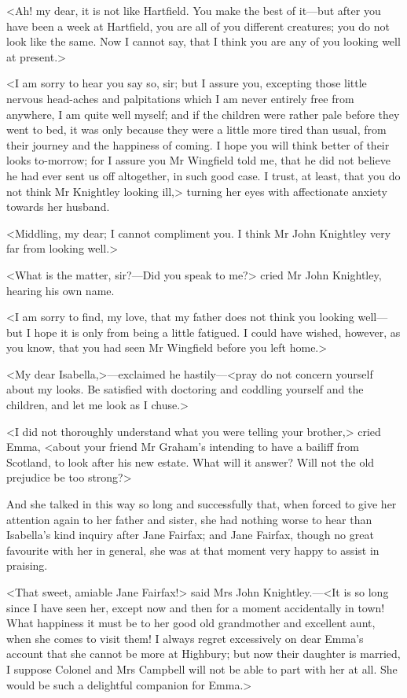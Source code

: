 <Ah! my dear, it is not like Hartfield. You make the best of it—but after you have been a week at Hartfield, you are all of you different creatures; you do not look like the same. Now I cannot say, that I think you are any of you looking well at present.>

<I am sorry to hear you say so, sir; but I assure you, excepting those little nervous head-aches and palpitations which I am never entirely free from anywhere, I am quite well myself; and if the children were rather pale before they went to bed, it was only because they were a little more tired than usual, from their journey and the happiness of coming. I hope you will think better of their looks to-morrow; for I assure you Mr Wingfield told me, that he did not believe he had ever sent us off altogether, in such good case. I trust, at least, that you do not think Mr Knightley looking ill,> turning her eyes with affectionate anxiety towards her husband.

<Middling, my dear; I cannot compliment you. I think Mr John Knightley very far from looking well.>

<What is the matter, sir?—Did you speak to me?> cried Mr John Knightley, hearing his own name.

<I am sorry to find, my love, that my father does not think you looking well—but I hope it is only from being a little fatigued. I could have wished, however, as you know, that you had seen Mr Wingfield before you left home.>

<My dear Isabella,>—exclaimed he hastily—<pray do not concern yourself about my looks. Be satisfied with doctoring and coddling yourself and the children, and let me look as I chuse.>

<I did not thoroughly understand what you were telling your brother,> cried Emma, <about your friend Mr Graham's intending to have a bailiff from Scotland, to look after his new estate. What will it answer? Will not the old prejudice be too strong?>

And she talked in this way so long and successfully that, when forced to give her attention again to her father and sister, she had nothing worse to hear than Isabella's kind inquiry after Jane Fairfax; and Jane Fairfax, though no great favourite with her in general, she was at that moment very happy to assist in praising.

<That sweet, amiable Jane Fairfax!> said Mrs John Knightley.—<It is so long since I have seen her, except now and then for a moment accidentally in town! What happiness it must be to her good old grandmother and excellent aunt, when she comes to visit them! I always regret excessively on dear Emma's account that she cannot be more at Highbury; but now their daughter is married, I suppose Colonel and Mrs Campbell will not be able to part with her at all. She would be such a delightful companion for Emma.>

